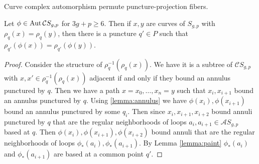 \begin{lemma}
  Curve complex automorphism permute puncture-projection fibers.

  Let $\phi \in \operatorname{Aut} \mathcal C S_{g,p}$ for $3g+p \geq 6$.
  Then if $x,y$ are curves of $S_{g,p}$ with
  $\rho_q(x)=\rho_q(y)$,
  then there is a puncture $q' \in P$ such that
  $\rho_{q'}(\phi(x))=\rho_{q'}(\phi(y))$.
  \label{lemma:fibers}
\end{lemma}

\begin{proof}
  Consider the structure of $\rho^{-1}_q(\rho_q(x))$.
  We have it is a subtree of $\mathcal C S_{g,p}$
  with $x,x' \in \rho^{-1}_q(\rho_q(x))$
  adjacent if and only if they bound an annulus punctured by $q$.
  Then we have a path $x=x_0, \ldots, x_n =y$
  such that $x_i,x_{i+1}$ bound an annulus punctured by $q$.
  Using \ref{lemma:annulus}
  we have $\phi(x_i),\phi(x_{i+1})$ bound an annulus
  punctured by some $q_i$.
  Then since $x_i,x_{i+1},x_{i+2}$ bound
  annuli  punctured by $q$ that
    are the regular neighborhoods of
  loops $a_i,a_{i+1} \in \mathcal A S_{g,p}$ based at $q$.
  Then
  $\phi(x_i),\phi(x_{i+1}), \phi(x_{i+2})$
  bound annuli that are the regular neighborhoods
  of loops $\phi_\ast(a_i), \phi_\ast(a_{i+1})$.
  By Lemma \ref{lemma:paint}
  $\phi_\ast(a_i)$ and $\phi_\ast(a_{i+1})$
  are based at a common point $q'$.
\end{proof}


